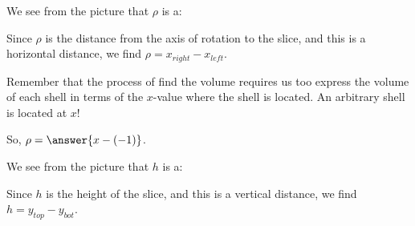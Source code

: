 \documentclass{ximera}
\begin{document}
\begin{exercise}
\begin{exercise}
\begin{exercise}
\begin{image}
  \end{image}
            
 We see from the picture that $\rho$ is a:
 \begin{multipleChoice}
 \end{multipleChoice}           
            
\begin{exercise}
Since $\rho$ is the distance from the axis of rotation to the slice, and this is a horizontal distance, we find $\rho = x_{right}-x_{left}$.
\begin{multipleChoice}
\end{multipleChoice}       

\begin{multipleChoice}
\end{multipleChoice}   

\begin{hint}
Remember that the process of find the volume requires us too express the volume of each shell in terms of the $x$-value where the shell is located.  An arbitrary shell is located at $x$!
\end{hint}

So, $\rho= \answer{x-(-1)}$.
 \end{exercise}
 
  We see from the picture that $h$ is a:
 \begin{multipleChoice}
 \end{multipleChoice}           
 
 \begin{exercise}
Since $h$ is the height of the slice, and this is a vertical distance, we find $h = y_{top}-y_{bot}$.
\begin{multipleChoice}
\end{multipleChoice}       


\end{exercise}
\end{exercise}
\end{exercise}
\end{exercise}
\end{document}
